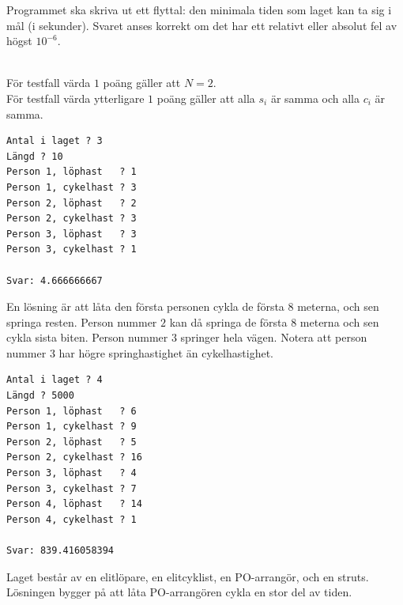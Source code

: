 Programmet ska skriva ut ett flyttal: den minimala tiden som laget kan ta sig i mål (i sekunder).
Svaret anses korrekt om det har ett relativt eller absolut fel av högst $10^{-6}$.

\\
För testfall värda $1$ poäng gäller att $N=2$. \\
För testfall värda ytterligare $1$ poäng gäller att alla $s_i$ är samma och alla $c_i$ är samma.\\

\begin{multicols}{2}
\begin{verbatim}
Antal i laget ? 3
Längd ? 10
Person 1, löphast   ? 1
Person 1, cykelhast ? 3
Person 2, löphast   ? 2
Person 2, cykelhast ? 3
Person 3, löphast   ? 3
Person 3, cykelhast ? 1

Svar: 4.666666667
\end{verbatim}
 En lösning är att låta den första personen cykla de första $8$ meterna, och sen springa resten. Person nummer $2$
kan då springa de första $8$ meterna och sen cykla sista biten. Person nummer $3$ springer hela vägen. Notera att person nummer $3$ har
högre springhastighet än cykelhastighet.
\vfill\columnbreak
{}
\begin{verbatim}
Antal i laget ? 4
Längd ? 5000
Person 1, löphast   ? 6
Person 1, cykelhast ? 9
Person 2, löphast   ? 5
Person 2, cykelhast ? 16
Person 3, löphast   ? 4
Person 3, cykelhast ? 7
Person 4, löphast   ? 14
Person 4, cykelhast ? 1

Svar: 839.416058394
\end{verbatim}
 Laget består av en elitlöpare, en elitcyklist, en PO-arrangör, och en struts. Lösningen bygger på att låta PO-arrangören
cykla en stor del av tiden.
\vfill
\end{multicols}




